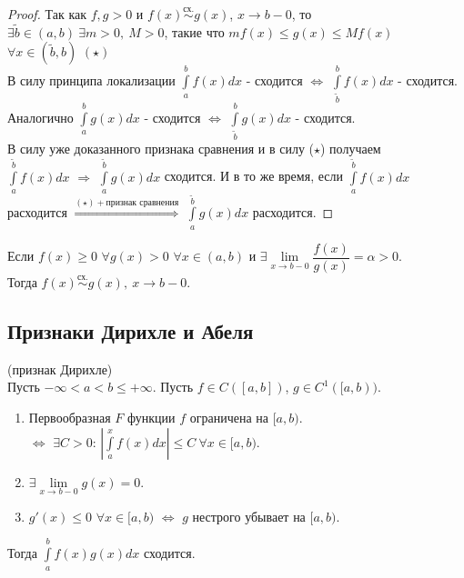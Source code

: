 \begin{proof}
    Так как $f, g > 0$ и $f(x) \overset{\text{сх.}}{\sim} g(x)$, $x \to b - 0$, то $\exists \widetilde{b} \in (a, b) \ \exists  m > 0, \ M > 0$, такие что $m f(x) \leq g(x) \leq M f(x)$ $\forall x \in (\widetilde{b}, b)$ $(\star)$ \\
    В силу принципа локализации 
    $ \int \limits_a^b f(x) dx$ - сходится $\Longleftrightarrow$ $ \int \limits_{\widetilde{b}}^b f(x) dx$ - сходится. \\
    Аналогично $ \int \limits_a^b g(x) dx$ - сходится $\Longleftrightarrow$ $ \int \limits_{\widetilde{b}}^b g(x) dx$ - сходится. \\
    В силу уже доказанного признака сравнения и в силу ($\star$) получаем \\ $\int \limits_a^{\widetilde{b}} f(x) dx$ $\Longrightarrow$ $\int \limits_a^{\widetilde{b}} g(x) dx$ сходится. И в то же время, если $\int \limits_a^{\widetilde{b}} f(x) dx$ расходится $\overset{(\star) + \text{признак сравнения}}{\Longrightarrow}$ $\int \limits_a^{\widetilde{b}} g(x) dx$ расходится.
\end{proof}

\begin{remark}
    Если $f(x) \geq 0$ $\forall g(x) > 0$ $\forall x \in (a, b)$ и $\exists \lim \limits_{x \to b - 0} \dfrac{f(x)}{g(x)} = \alpha > 0$. \\
    Тогда $f(x) \overset{\text{сх.}}{\sim} g(x), \ x \to b - 0.$
\end{remark}

\subsection{Признаки Дирихле и Абеля}

\begin{theorem} (признак Дирихле) \\
Пусть $- \infty < a < b \leq + \infty $. Пусть $f \in C([a, b])$, $g \in C^1([a, b))$. \\
\begin{enumerate}
    \item Первообразная $F$ функции $f$ ограничена на $[a, b).$ \\
    $\Longleftrightarrow$ $\exists C > 0$: $\left| \int \limits_a^x  f(x) dx \right| \leq C \ \forall x \in [a, b).$
    \item $\exists \lim \limits_{x \to b - 0} g(x) = 0.$
    \item $g'(x) \leq 0$ $\forall x \in [a, b)$ $\Longleftrightarrow$ $g$ нестрого убывает на $[a, b)$.
\end{enumerate}
Тогда $\int \limits_a^b f(x) g(x) dx$ сходится.
    
\end{theorem}

